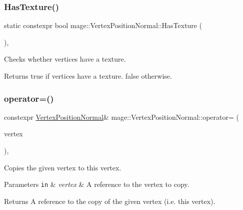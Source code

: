 \subsubsection{\texorpdfstring{Has\+Texture()}{HasTexture()}}
{\footnotesize\ttfamily static constexpr bool mage\+::\+Vertex\+Position\+Normal\+::\+Has\+Texture (\begin{DoxyParamCaption}{ }\end{DoxyParamCaption})\hspace{0.3cm}{\ttfamily [static]}, {\ttfamily [noexcept]}}

Checks whether vertices have a texture.

\begin{DoxyReturn}{Returns}
{\ttfamily true} if vertices have a texture. {\ttfamily false} otherwise. 
\end{DoxyReturn}
\hypertarget{structmage_1_1_vertex_position_normal_a61c158d1c031a965b3512e217ac1dcff}{}\label{structmage_1_1_vertex_position_normal_a61c158d1c031a965b3512e217ac1dcff} 
\subsubsection{\texorpdfstring{operator=()}{operator=()}\hspace{0.1cm}{\footnotesize\ttfamily [1/2]}}
{\footnotesize\ttfamily constexpr \hyperlink{structmage_1_1_vertex_position_normal}{Vertex\+Position\+Normal}\& mage\+::\+Vertex\+Position\+Normal\+::operator= (\begin{DoxyParamCaption}\item[{const \hyperlink{structmage_1_1_vertex_position_normal}{Vertex\+Position\+Normal} \&}]{vertex }\end{DoxyParamCaption})\hspace{0.3cm}{\ttfamily [default]}, {\ttfamily [noexcept]}}

Copies the given vertex to this vertex.


\begin{DoxyParams}[1]{Parameters}
\mbox{\tt in}  & {\em vertex} & A reference to the vertex to copy. \\
\hline
\end{DoxyParams}
\begin{DoxyReturn}{Returns}
A reference to the copy of the given vertex (i.\+e. this vertex). 
\end{DoxyReturn}
\hypertarget{structmage_1_1_vertex_position_normal_aac2b96802bda78c0f312985d9602b103}{}\label{structmage_1_1_vertex_position_normal_aac2b96802bda78c0f312985d9602b103} 
